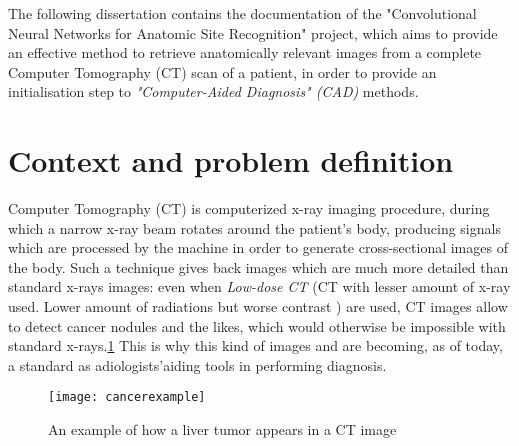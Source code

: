 \documentclass[../main.tex]{subfiles}
\begin{document}
\thispagestyle{empty}

The following dissertation contains the documentation of the "Convolutional Neural Networks for Anatomic Site Recognition" project, which aims to provide an effective method to retrieve anatomically relevant images from a complete Computer Tomography (CT) scan of a patient, in order to provide an initialisation step to \textit{"Computer-Aided Diagnosis" (CAD)} methods.

\section{Context and problem definition}

Computer Tomography (CT) is computerized x-ray imaging procedure, during which a narrow x-ray beam rotates around the patient's body, producing signals which are processed by the machine in order to generate cross-sectional images of the body.\cite{U.S.Depa} Such a technique gives back images which are much more detailed than standard x-rays images: even when \textit{Low-dose CT} (CT with lesser amount of x-ray used. Lower amount of radiations but worse contrast ) are used, CT images allow to detect cancer nodules and the likes, which would otherwise be impossible with standard x-rays.\ref{cancerexample} This is why this kind of images and are becoming, as of today, a standard as adiologists'aiding tools in performing diagnosis.\cite{Indicators2017} 

\begin{figure}[h] 
\centering 
\texttt{[image: cancerexample]}
\caption{An example of how a liver tumor appears in a CT image} 
\label{cancerexample} 
\vspace{5mm}
\end{figure}

\vspace{5mm}
\end{document}
